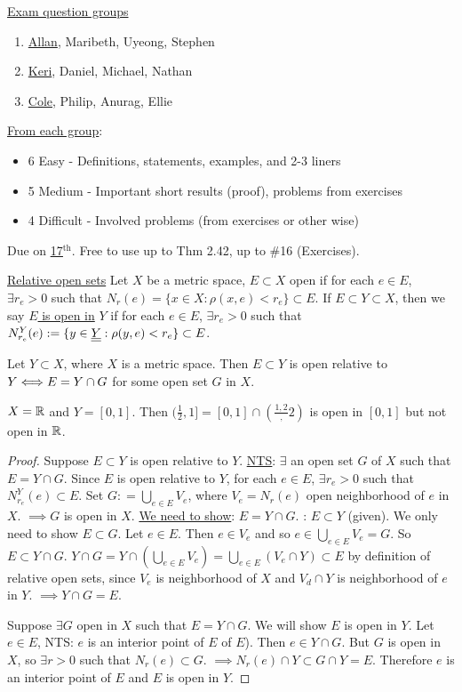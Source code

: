 \documentclass[]{article}
\begin{document}
\ul{Exam question groups}
\begin{enumerate}
	\item \ul{Allan}, Maribeth, Uyeong, Stephen
	\item \ul{Keri}, Daniel, Michael, Nathan
	\item \ul{Cole}, Philip, Anurag, Ellie
\end{enumerate}
\ul{From each group}:
\begin{itemize}
	\item 6 Easy - Definitions, statements, examples, and 2-3 liners
	\item 5 Medium - Important short results (proof), problems from exercises
	\item 4 Difficult - Involved problems (from exercises or other wise)
\end{itemize}
Due on \ul{\ul{17$^\text{th}$}}.
Free to use up to Thm 2.42, up to \#16 (Exercises).

\ul{Relative open sets}
Let $X$ be a metric space, $E\subset X$ open if for each $e\in E$, $\exists r_e>0$ such that $N_r(e) = \{x\in X:\rho(x,e)<r_e\} \subset E$.
If $E\subset Y\subset X$, then we say \ul{$E$ is open in} $Y$ if for each $e\in E$, $\exists r_e>0$ such that $N_{r_e}^Y(e) := \{y\in \underline{\underline{Y}}:\rho(y,e)< r_e\} \subset E$.

\begin{theorem}
	Let $Y\subset X$, where $X$ is a metric space. Then $E\subset Y$ is open relative to $Y \Longleftrightarrow E = Y\cap G$ for some open set $G$ in $X$.
\end{theorem}
\begin{example}
	$X = \mathbb{R}$ and $Y = [0,1]$. Then $(\frac{1}{2},1] = [0,1]\cap(\frac{1,2},2)$ is open in $[0,1]$ but not open in $\mathbb{R}$.
\end{example}
\begin{proof}
	\say{$\implies$} Suppose $E\subset Y$ is open relative to $Y$.
	\ul{\ul{NTS}}: $\exists$ an open set $G$ of $X$ such that $E = Y\cap G$.
	Since $E$ is open relative to $Y$, for each $e\in E$, $\exists r_e>0$ such that $N_{r_e}^Y(e) \subset E$.
	Set $G: = \bigcup_{e\in E} V_e$, where $V_e = N_r(e)$ open neighborhood of $e$ in $X$.
	$\implies G$ is open in $X$.
	\ul{We need to show}: $E = Y\cap G$.
	\say{$\subset$}: $E\subset Y$ (given). We only need to show $E\subset G$.
	Let $e\in E$. Then $e\in V_e$ and so $e\in \bigcup_{e\in E} V_e = G$.
	So $E\subset Y\cap G$.
	\say{$\supset$} $Y\cap G = Y\cap\left(\bigcup_{e\in E} V_e\right) = \bigcup_{e\in E} (V_e \cap Y) \subset E$ by definition of relative open sets, since $V_e$ is neighborhood of $X$ and $V_d\cap Y$ is neighborhood of $e$ in $Y$.
	$\implies Y\cap G = E$.

	\say{$\Lla$} Suppose $\exists G$ open in $X$ such that $E = Y\cap G$. We will show $E$ is open in $Y$.
	Let $e\in E$, NTS: $e$ is an interior point of $E$ of $E$).
	Then $e\in Y\cap G$. But $G$ is open in $X$, so $\exists r>0$ such that $N_r(e) \subset G$.
	$\implies N_r(e)\cap Y\subset G\cap Y = E$.
	Therefore $e$ is an interior point of $E$ and $E$ is open in $Y$.
\end{proof}
\end{document}

